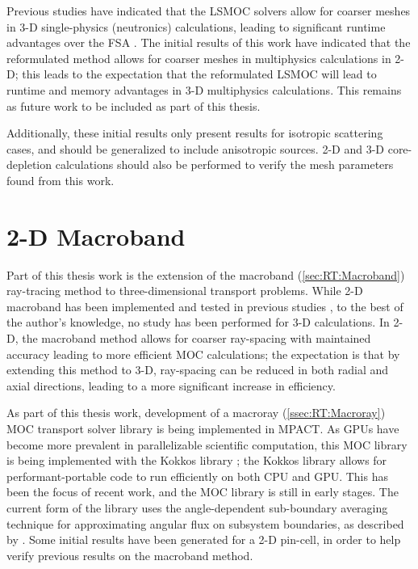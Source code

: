{{{            Previous studies have indicated that the \ac{LSMOC} solvers allow for coarser meshes in 3-D single-physics (neutronics) calculations, leading to significant runtime advantages over the \ac{FSA} \cite{Boyd2014,Gunow2018}.
            The initial results of this work have indicated that the reformulated method allows for coarser meshes in multiphysics calculations in 2-D; this leads to the expectation that the reformulated \ac{LSMOC} will lead to runtime and memory advantages in 3-D multiphysics calculations.
            This remains as future work to be included as part of this thesis.

            Additionally, these initial results only present results for isotropic scattering cases, and should be generalized to include anisotropic sources.
            2-D and 3-D core-depletion calculations should also be performed to verify the mesh parameters found from this work.
        }
    }
    \section{2-D Macroband}{\label{sec:Results:2-D Macroband}
        Part of this thesis work is the extension of the macroband (\cref{sec:RT:Macroband}) ray-tracing method to three-dimensional transport problems.
        While 2-D macroband has been implemented and tested in previous studies \cite{Petkov1998,Yamamoto2005,Fevotte2007,Yamamoto2008}, to the best of the author's knowledge, no study has been performed for 3-D calculations.
        In 2-D, the macroband method allows for coarser ray-spacing with maintained accuracy leading to more efficient \ac{MOC} calculations; the expectation is that by extending this method to 3-D, ray-spacing can be reduced in both radial and axial directions, leading to a more significant increase in efficiency.

        As part of this thesis work, development of a macroray (\cref{ssec:RT:Macroray}) \ac{MOC} transport solver library is being implemented in MPACT.
        As \acp{GPU} have become more prevalent in parallelizable scientific computation, this \ac{MOC} library is being implemented with the Kokkos library \cite{Kokkos}; the Kokkos library allows for performant-portable code to run efficiently on both \ac{CPU} and \ac{GPU}.
        This has been the focus of recent work, and the \ac{MOC} library is still in early stages.
        The current form of the library uses the angle-dependent sub-boundary averaging technique for approximating angular flux on subsystem boundaries, as described by \citet{Liu2014}.
        Some initial results have been generated for a 2-D pin-cell, in order to help verify previous results on the macroband method.

}}
